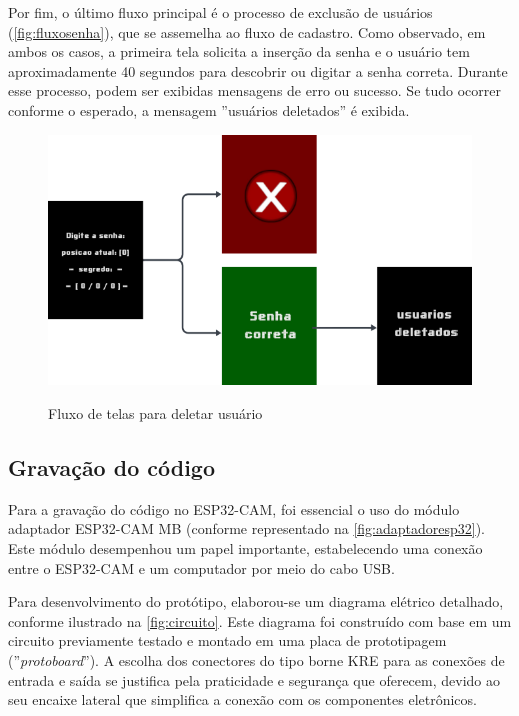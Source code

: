 Por fim, o último fluxo principal é o processo de exclusão 
de usuários (\autoref{fig:fluxosenha}), que se assemelha 
ao fluxo de cadastro. Como observado, em ambos 
os casos, a primeira tela solicita a inserção 
da senha e o usuário tem aproximadamente 40 segundos 
para descobrir ou digitar a senha correta. Durante esse processo, 
podem ser exibidas mensagens de erro ou sucesso. Se tudo ocorrer 
conforme o esperado, a mensagem ''usuários deletados'' é exibida.

\begin{figure}[h!]
    \centering
    \caption{Fluxo de telas para deletar usuário}
    \includegraphics[scale=1.8]{figuras/fluxo_deletar_usuario.png}
    \fonte{}%
    \label{fig:fluxosenha}
    \centering
\end{figure}

\subsection{Gravação do código}\label{sec:gravador}

Para a gravação do código no ESP32-CAM, foi essencial o uso do módulo 
adaptador ESP32-CAM MB (conforme representado na 
\autoref{fig:adaptadoresp32}). Este módulo desempenhou um papel importante, 
estabelecendo uma conexão entre o ESP32-CAM e um computador por meio 
do cabo USB.

Para desenvolvimento do protótipo, elaborou-se um diagrama elétrico 
detalhado, conforme ilustrado na \autoref{fig:circuito}. Este diagrama 
foi construído com base em um circuito previamente testado e montado em 
uma placa de prototipagem (''\textit{protoboard}''). A escolha dos conectores do 
tipo borne KRE para as conexões de entrada e saída se justifica pela 
praticidade e segurança que oferecem, devido ao seu encaixe lateral que 
simplifica a conexão com os componentes eletrônicos.

